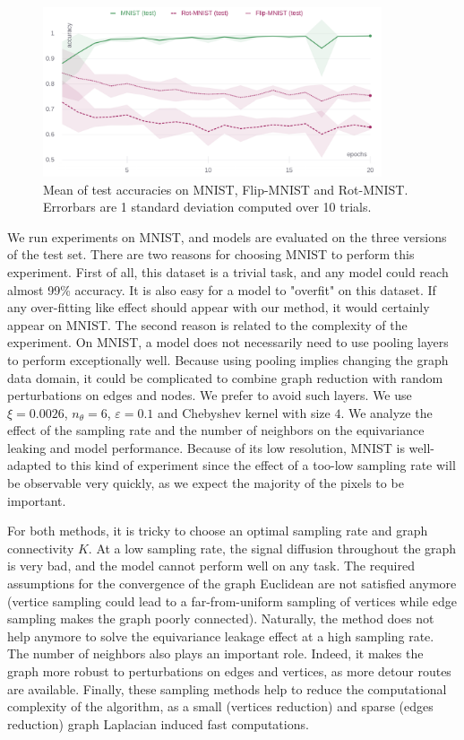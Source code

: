 \documentclass{article}
\begin{document}
\begin{figure}[h!] 
    \centering
    \includegraphics[width=10cm]{Images/equivariance_leakage.png}
    \caption{Mean of test accuracies on MNIST, Flip-MNIST and Rot-MNIST. Errorbars are 1 standard deviation computed over 10 trials.}
    \label{fig:equivariance_leaking}
\end{figure}

We run experiments on MNIST, and models are evaluated on the three versions of the test set. There are two reasons for choosing MNIST to perform this experiment. First of all, this dataset is a trivial task, and any model could reach almost 99\% accuracy. It is also easy for a model to "overfit" on this dataset. If any over-fitting like effect should appear with our method, it would certainly appear on MNIST. The second reason is related to the complexity of the experiment. On MNIST, a model does not necessarily need to use pooling layers to perform exceptionally well. Because using pooling implies changing the graph data domain, it could be complicated to combine graph reduction with random perturbations on edges and nodes. We prefer to avoid such layers. We use $\xi = 0.0026$, $n_\theta = 6$, $\varepsilon = 0.1$ and Chebyshev kernel with size $4$. We analyze the effect of the sampling rate and the number of neighbors on the equivariance leaking and model performance. Because of its low resolution, MNIST is well-adapted to this kind of experiment since the effect of a too-low sampling rate will be observable very quickly, as we expect the majority of the pixels to be important.


For both methods, it is tricky to choose an optimal sampling rate and graph connectivity $K$. At a low sampling rate, the signal diffusion throughout the graph is very bad, and the model cannot perform well on any task. The required assumptions for the convergence of the graph Euclidean are not satisfied anymore (vertice sampling could lead to a far-from-uniform sampling of vertices while edge sampling makes the graph poorly connected). Naturally, the method does not help anymore to solve the equivariance leakage effect at a high sampling rate. The number of neighbors also plays an important role. Indeed, it makes the graph more robust to perturbations on edges and vertices, as more detour routes are available. Finally, these sampling methods help to reduce the computational complexity of the algorithm, as a small (vertices reduction) and sparse (edges reduction) graph Laplacian induced fast computations.
\end{document}
